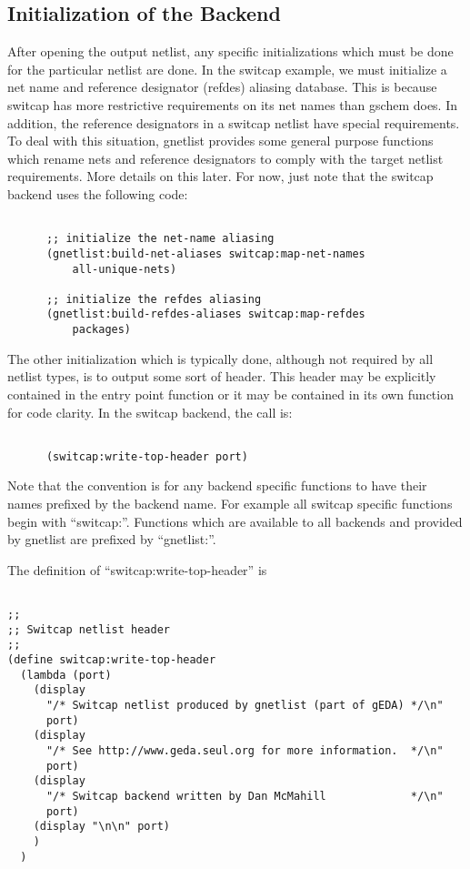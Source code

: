 \documentclass{article}
\begin{document}
\subsection{Initialization of the Backend}
After opening the output netlist, any specific initializations which
must be done for the particular netlist are done.  In the switcap
example, we must initialize a net name and reference designator
(refdes) aliasing database.  This is because switcap has  more
restrictive requirements on its net names than gschem does.  In
addition, the reference designators in a switcap netlist have special
requirements.  To deal with this situation, gnetlist provides some
general purpose functions which rename nets and reference designators
to comply with the target netlist requirements.  More details on this
later.  For now, just note that the switcap backend uses the following
code: 

\begin{verbatim}

      ;; initialize the net-name aliasing
      (gnetlist:build-net-aliases switcap:map-net-names 
          all-unique-nets)

      ;; initialize the refdes aliasing
      (gnetlist:build-refdes-aliases switcap:map-refdes
          packages)

\end{verbatim}

The other initialization which is typically done, although not
required by all netlist types, is to output some sort of header.  This
header may be explicitly contained in the entry point function or it
may be contained in its own function for code clarity.  In the switcap
backend, the call is:

\begin{verbatim}

      (switcap:write-top-header port)

\end{verbatim}
Note that the convention is for any backend specific functions to have
their names prefixed by the backend name.  For example all switcap
specific functions begin with ``switcap:''.  Functions which are
available to all backends and provided by gnetlist are prefixed by
``gnetlist:''.

The definition of ``switcap:write-top-header'' is 

\begin{verbatim}

;; 
;; Switcap netlist header
;;
(define switcap:write-top-header
  (lambda (port)
    (display 
      "/* Switcap netlist produced by gnetlist (part of gEDA) */\n" 
      port)  
    (display 
      "/* See http://www.geda.seul.org for more information.  */\n"
      port)  
    (display 
      "/* Switcap backend written by Dan McMahill             */\n"
      port)
    (display "\n\n" port)
    )
  )


\end{verbatim}
\end{document}
